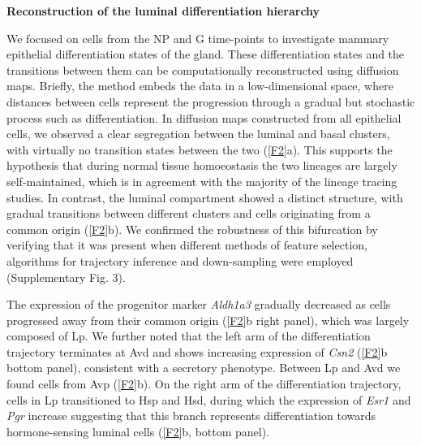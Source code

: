\documentclass[titlepage, 12pt, oneside]{amsart}
\begin{document}
\textbf{Reconstruction of the luminal differentiation hierarchy}

We focused on cells from the NP and G time-points to investigate mammary epithelial differentiation states of the gland.
These differentiation states and the transitions between them can be computationally reconstructed using diffusion maps.
Briefly, the method embeds the data in a low-dimensional space, where distances between cells represent the progression through a gradual but stochastic process such as differentiation.
In diffusion maps constructed from all epithelial cells, we observed a clear segregation between the luminal and basal clusters, with virtually no transition states between the two (\autoref{F2}a).
This supports the hypothesis that during normal tissue homoeostasis the two lineages are largely self-maintained, which is in agreement with the majority of the lineage tracing studies\autocite{VanKeymeulen2011,VanAmerongen2012,Davis2016}.
In contrast, the luminal compartment showed a distinct structure, with gradual transitions between different clusters and cells originating from a common origin (\autoref{F2}b).
We confirmed the robustness of this bifurcation by verifying that it was present when different methods of feature selection, algorithms for trajectory inference and down-sampling were employed (Supplementary Fig. 3).

The expression of the progenitor marker \textit{Aldh1a3} gradually decreased as cells progressed away from their common origin (\autoref{F2}b right panel), which was largely composed of Lp.
We further noted that the left arm of the differentiation trajectory terminates at Avd and shows increasing expression of \textit{Csn2} (\autoref{F2}b bottom panel), consistent with a secretory phenotype.
Between Lp and Avd we found cells from Avp (\autoref{F2}b).
On the right arm of the differentiation trajectory, cells in Lp transitioned to Hsp and Hsd, during which the expression of \textit{Esr1} and \textit{Pgr} increase suggesting that this branch represents differentiation towards hormone-sensing luminal cells (\autoref{F2}b, bottom panel).
\end{document}
